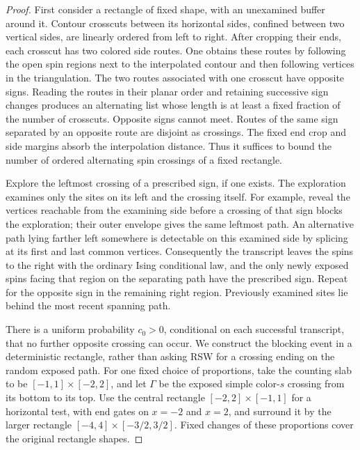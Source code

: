 \begin{proof}
First consider a rectangle of fixed shape, with an unexamined buffer
around it.  Contour crosscuts between its horizontal sides, confined
between two vertical sides, are linearly ordered from left to right.
After cropping their ends, each crosscut has two colored side routes.
One obtains these routes by following the open spin regions next to
the interpolated contour and then following vertices in the
triangulation.  The two routes associated with one crosscut have
opposite signs.  Reading the routes in their planar order and retaining
successive sign changes produces an alternating list whose length is
at least a fixed fraction of the number of crosscuts.  Opposite signs
cannot meet.  Routes of the same sign separated by an opposite route
are disjoint as crossings.  The fixed end crop and side margins absorb
the interpolation distance.  Thus it suffices to bound the number of
ordered alternating spin crossings of a fixed rectangle.

Explore the leftmost crossing of a prescribed sign, if one exists.
The exploration examines only the sites on its left and the crossing
itself.  For example, reveal the vertices reachable from the examining
side before a crossing of that sign blocks the exploration; their
outer envelope gives the same leftmost path.  An alternative path
lying farther left somewhere is detectable on this examined side by
splicing at its first and last common vertices.  Consequently the
transcript leaves the spins to the right with the ordinary Ising
conditional law, and the only newly exposed spins facing that region
on the separating path have the prescribed sign.  Repeat for the
opposite sign in the remaining right region.  Previously examined
sites lie behind the most recent spanning path.

There is a uniform probability $c_0>0$, conditional on each successful
transcript, that no further opposite crossing can occur.  We construct
the blocking event in a deterministic rectangle, rather than asking RSW
for a crossing ending on the random exposed path.  For one fixed choice of proportions, take the counting slab to be
$[-1,1]\times[-2,2]$, and let $\Gamma$ be the exposed simple
color-$s$ crossing from its bottom to its top.  Use the central rectangle
$[-2,2]\times[-1,1]$ for a horizontal test, with end gates on
$x=-2$ and $x=2$, and surround it by the larger rectangle
$[-4,4]\times[-3/2,3/2]$.  Fixed changes of these proportions cover
the original rectangle shapes.


\end{proof}
